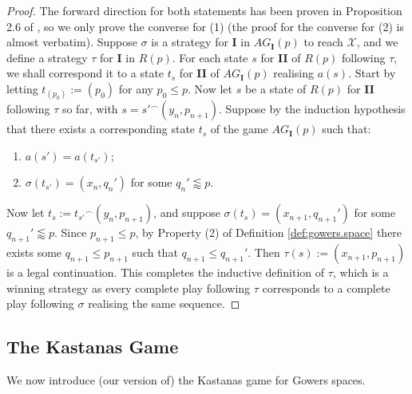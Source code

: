 \documentclass[11pt,reqno]{amsart}
\theoremstyle{plain}
\numberwithin{equation}{section}
\theoremstyle{definition}
\newcommand{\cal}{\mathcal}
\newcommand{\X}{\cal{X}}
\begin{document}
\begin{proof}
    The forward direction for both statements has been proven in Proposition 2.6 of \cite{d20}, so we only prove the converse for (1) (the proof for the converse for (2) is almost verbatim). Suppose $\sigma$ is a strategy for \textbf{I} in $AG_\textbf{I}(p)$ to reach $\X$, and we define a strategy $\tau$ for \textbf{I} in $R(p)$. For each state $s$ for \textbf{II} of $R(p)$ following $\tau$, we shall correspond it to a state $t_s$ for \textbf{II} of $AG_\textbf{I}(p)$ realising $a(s)$. Start by letting $t_{(p_0)} := (p_0)$ for any $p_0 \leq p$. Now let $s$ be a state of $R(p)$ for \textbf{II} following $\tau$ so far, with $s = {s'}^\frown(y_n,p_{n+1})$. Suppose by the induction hypothesis that there exists a corresponding state $t_s$ of the game $AG_\textbf{I}(p)$ such that:
    \begin{enumerate}
        \item $a(s') = a(t_{s'})$;

        \item $\sigma(t_{s'}) = (x_n,q_n')$ for some $q_n' \lessapprox p$.
    \end{enumerate}
    Now let $t_s := {t_{s'}}^\frown(y_n,p_{n+1})$, and suppose $\sigma(t_s) = (x_{n+1},q_{n+1}')$ for some $q_{n+1}' \lessapprox p$. Since $p_{n+1} \leq p$, by Property (2) of Definition \ref{def:gowers.space} there exists some $q_{n+1} \leq p_{n+1}$ such that $q_{n+1} \leq q_{n+1}'$. Then $\tau(s) := (x_{n+1},p_{n+1})$ is a legal continuation. This completes the inductive definition of $\tau$, which is a winning strategy as every complete play following $\tau$ corresponds to a complete play following $\sigma$ realising the same sequence.
\end{proof}

\subsection{The Kastanas Game}
We now introduce (our version of) the Kastanas game for Gowers spaces.
\end{document}

